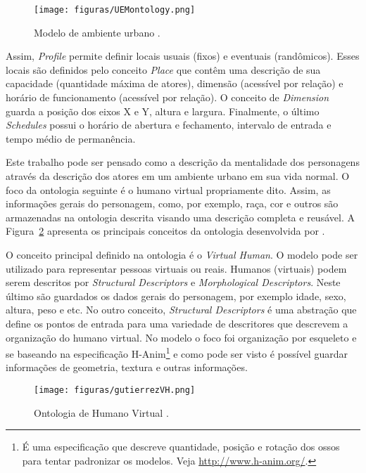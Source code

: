 \begin{figure}[t]
  \centering
    \texttt{[image: figuras/UEMontology.png]}
  \caption{Modelo de ambiente urbano \cite{paiva2005ontology}.}
  \label{fig:UEM}
\end{figure}

Assim, \emph{Profile} permite definir locais usuais (fixos) e eventuais
(randômicos). Esses locais são definidos pelo conceito \emph{Place} que contêm
uma descrição de sua capacidade (quantidade máxima de atores), dimensão
(acessível por relação) e horário de funcionamento (acessível por relação). O
conceito de \emph{Dimension} guarda a posição dos eixos X e Y, altura e
largura. Finalmente, o último \emph{Schedules} possui o horário de abertura e
fechamento, intervalo de entrada e tempo médio de permanência. %

Este trabalho pode ser pensado como a descrição da mentalidade dos personagens
através da descrição dos atores em um ambiente urbano em sua vida normal. O
foco da ontologia seguinte é o humano virtual propriamente dito. Assim, as
informações gerais do personagem, como, por exemplo, raça, cor e outros são
armazenadas na ontologia descrita visando uma descrição completa e reusável.
A Figura~\ref{fig:OVH} apresenta os principais conceitos da ontologia
desenvolvida por \citet{Gutierrez:2007:OVH:1229160.1229164}.

O conceito principal definido na ontologia é o \emph{Virtual Human}. O modelo
pode ser utilizado para representar pessoas virtuais ou reais. Humanos
(virtuais) podem serem descritos por \emph{Structural Descriptors} e
\emph{Morphological Descriptors}. Neste último são guardados os dados gerais
do personagem, por exemplo idade, sexo, altura, peso e etc. No outro conceito,
\emph{Structural Descriptors} é uma abstração que define os pontos de entrada
para uma variedade de descritores que descrevem a organização do humano
virtual. No modelo o foco foi organização por esqueleto e se baseando na
especificação H-Anim\footnote{É uma especificação que descreve quantidade,
posição e rotação dos ossos para tentar padronizar os modelos.
Veja \url{http://www.h-anim.org/}.} e como pode ser visto é possível guardar
informações de geometria, textura e outras informações.

\begin{figure}[t]
  \centering
    \texttt{[image: figuras/gutierrezVH.png]}
  \caption{Ontologia de Humano Virtual \cite{Gutierrez:2007:OVH:1229160.1229164}.}
  \label{fig:OVH}
\end{figure}

